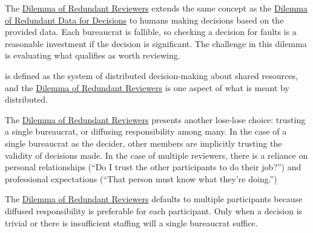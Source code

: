 The \hyperref[table:dilemma-personal-redundant-reviewers]{Dilemma of Redundant Reviewers} extends the same concept as the \hyperref[table:dilemma-personal-single-bit-decision]{Dilemma of Redundant Data for Decisions} to humans making decisions based on the provided data. Each bureaucrat is fallible, so checking a decision for faults is a reasonable investment if the decision is significant. The challenge in this dilemma is evaluating what qualifies as worth reviewing.

\iftoggle{glossarysubstitutionworks}{\Gls{distributed bureaucracy}}{Bureaucracy} is 
defined as the system of distributed decision-making about shared resources, and 
the \hyperref[table:dilemma-personal-redundant-reviewers]{Dilemma of Redundant Reviewers} is 
one aspect of what is meant by distributed.

The \hyperref[table:dilemma-personal-redundant-reviewers]{Dilemma of Redundant Reviewers} presents another 
lose-lose choice: trusting a single bureaucrat, or diffusing responsibility among many. In the case of a single bureaucrat as the decider, other members are implicitly trusting the validity of decisions made. In the case of multiple reviewers, there is a reliance on personal relationships (``Do I trust the other participants to do their job?'') and professional expectations (``That person must know what they're doing.'')

The \hyperref[table:dilemma-personal-redundant-reviewers]{Dilemma of Redundant Reviewers} defaults to multiple participants because diffused responsibility is preferable for each participant. Only when a decision is trivial or there is insufficient staffing will a single bureaucrat suffice.

